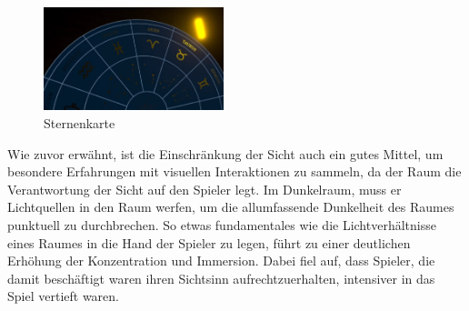 \begin{figure}[h]
	\centering
	\includegraphics[width=\textwidth/3, height=3cm]{Pictures/Dunkelraum_Sternenkarte}
	\caption{Sternenkarte}
	\label{fig:dunkelraum_sternenkarte}
\end{figure}\newpage \noindent
Wie zuvor erwähnt, ist die Einschränkung der Sicht auch ein gutes Mittel, um besondere Erfahrungen mit visuellen Interaktionen zu sammeln, da der Raum die Verantwortung der Sicht auf den Spieler legt. Im Dunkelraum, muss er Lichtquellen in den Raum werfen, um die allumfassende Dunkelheit des Raumes punktuell zu durchbrechen. So etwas fundamentales wie die Lichtverhältnisse eines Raumes in die Hand der Spieler zu legen, führt zu einer deutlichen Erhöhung der Konzentration und Immersion. Dabei fiel auf, dass Spieler, die damit beschäftigt waren ihren Sichtsinn aufrechtzuerhalten, intensiver in das Spiel vertieft waren.
